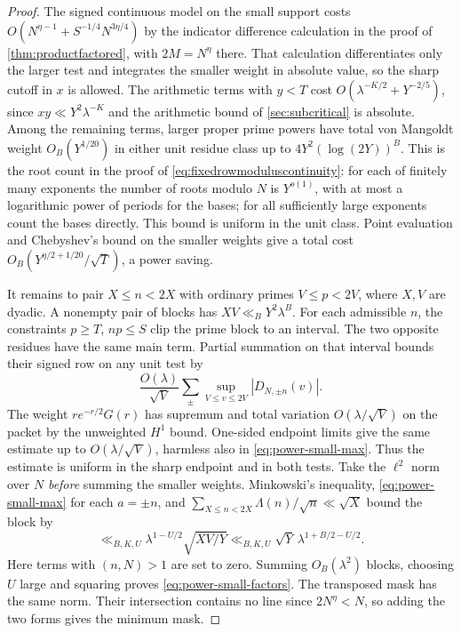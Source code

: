 \documentclass[11pt,a4paper]{article}
\numberwithin{equation}{section}
\begin{document}
\begin{proof}
The signed continuous model on the small support costs
$O(N^{\eta-1}+S^{-1/4}N^{3\eta/4})$ by the indicator
difference calculation in the proof of \cref{thm:productfactored},
with $2M=N^\eta$ there. That calculation differentiates only
the larger test and integrates the smaller weight in absolute
value, so the sharp cutoff in $x$ is allowed. The arithmetic terms with $y<T$ cost
$O(\lambda^{-K/2}+Y^{-2/5})$, since $xy\ll Y^2\lambda^{-K}$
and the arithmetic bound of \cref{sec:subcritical} is absolute.
Among the remaining terms, larger proper prime powers have total
von Mangoldt weight $O_B(Y^{1/20})$ in either unit residue
class up to $4Y^2(\log(2Y))^B$. This is the root count in the
proof of \cref{eq:fixedrowmoduluscontinuity}: for each of finitely
many exponents the number of roots modulo $N$ is $Y^{o(1)}$,
with at most a logarithmic power of periods for the bases; for
all sufficiently large exponents count the bases directly.
This bound is uniform in the unit class. Point evaluation and
Chebyshev's bound on the smaller weights give a total cost
$O_B(Y^{\eta/2+1/20}/\sqrt T)$, a power saving.

It remains to pair $X\le n<2X$ with ordinary primes
$V\le p<2V$, where $X,V$ are dyadic. A nonempty pair of
blocks has $XV\ll_B Y^2\lambda^B$. For each admissible $n$,
the constraints $p\ge T$, $np\le S$ clip the prime block to
an interval. The two opposite residues have the same main
term. Partial summation on that interval bounds their signed
row on any unit test by
\[
 \frac{O(\lambda)}{\sqrt V}
 \sum_{\pm}\sup_{V\le v\le2V}|D_{N,\pm n}(v)|.
\]
The weight $r e^{-r/2}G(r)$ has supremum and total variation
$O(\lambda/\sqrt V)$ on the packet by the unweighted $H^1$
bound. One-sided endpoint limits give the same estimate up to
$O(\lambda/\sqrt V)$, harmless also in \cref{eq:power-small-max}.
Thus the estimate is uniform in the sharp endpoint and in
both tests. Take the $\ell^2$ norm over $N$ \emph{before}
summing the smaller weights. Minkowski's inequality,
\cref{eq:power-small-max} for each $a=\pm n$, and
$\sum_{X\le n<2X}\Lambda(n)/\sqrt n\ll\sqrt X$ bound the
block by
\[
 \ll_{B,K,U} \lambda^{1-U/2}\sqrt{XV/Y}
 \ll_{B,K,U} \sqrt Y\,\lambda^{1+B/2-U/2}.
\]
Here terms with $(n,N)>1$ are set to zero. Summing
$O_B(\lambda^2)$ blocks, choosing $U$ large and squaring
proves \cref{eq:power-small-factors}. The transposed mask has
the same norm. Their intersection contains no line since
$2N^\eta<N$, so adding the two forms gives the minimum mask.


\end{proof}
\end{document}
